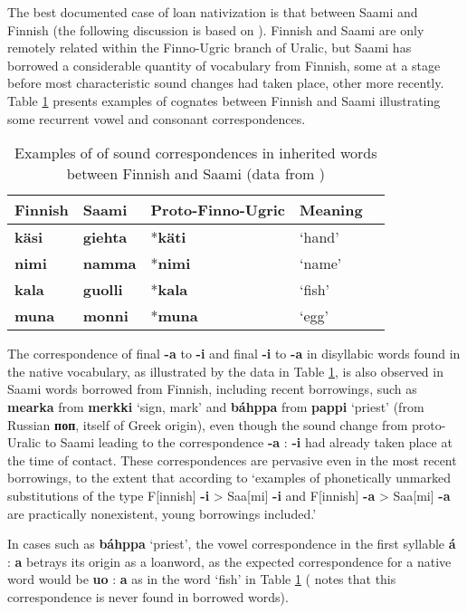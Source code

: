 \documentclass[oneside,a4paper,11pt]{article}
\newcommand{\ipa}[1]{\textbf{{\phon\mbox{#1}}}} %
\begin{document}
The best documented case of loan nativization is that between Saami and Finnish (the following discussion is based on \citealt{aikio06nativization}). Finnish and Saami are only remotely related within the Finno-Ugric branch of Uralic, but  Saami has borrowed a considerable quantity of vocabulary from Finnish, some at a stage before most characteristic sound changes had taken place, other more recently. Table \ref{tab:native} presents examples of cognates between Finnish and Saami illustrating some recurrent vowel and consonant correspondences.

\begin{table}[h]
\caption{Examples of of sound correspondences in inherited words between Finnish and Saami (data from \citealt[27]{aikio06nativization})} \centering \label{tab:native}
\begin{tabular}{lllll}
\toprule
Finnish & Saami & Proto-Finno-Ugric & Meaning \\
\midrule
\ipa{käsi} & \ipa{giehta} & *\ipa{käti} & `hand' \\
\ipa{nimi} & \ipa{namma} & *\ipa{nimi} & `name' \\
\ipa{kala} & \ipa{guolli} & *\ipa{kala} & `fish' \\
\ipa{muna} & \ipa{monni} & *\ipa{muna} & `egg' \\
\bottomrule
\end{tabular}
\end{table}

The correspondence of final \ipa{-a} to \ipa{-i} and final \ipa{-i} to \ipa{-a} in disyllabic words found in the native vocabulary, as illustrated by the data in Table \ref{tab:native}, is also observed in Saami words borrowed from Finnish, including recent borrowings, such as \ipa{mearka} from \ipa{merkki} `sign, mark' and \ipa{báhppa} from \ipa{pappi} `priest' (from Russian \ipa{поп}, itself of Greek origin), even though the sound change from proto-Uralic to Saami leading to the correspondence \ipa{-a} : \ipa{-i} had already taken place at the time of contact. These correspondences are pervasive even in the most recent borrowings, to the extent that according to \citet[36]{aikio06nativization} `examples of phonetically unmarked substitutions of the type F[innish] \ipa{-i} > Saa[mi] \ipa{-i} and F[innish] \ipa{-a} > Saa[mi] \ipa{-a} are practically nonexistent, young borrowings included.'

In cases such as \ipa{báhppa} `priest', the vowel correspondence in the first syllable \ipa{á} : \ipa{a} betrays its origin as a loanword, as the expected correspondence for a native word would be \ipa{uo} : \ipa{a} as in the word `fish' in Table \ref{tab:native} (\citealt[35]{aikio06nativization} notes that this correspondence is never found in borrowed words).
\end{document}
